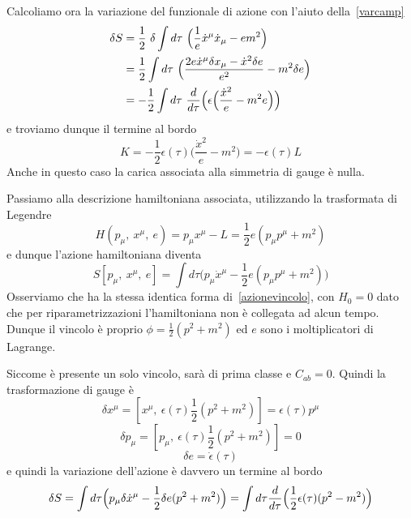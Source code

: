    Calcoliamo ora la variazione del funzionale di azione con l'aiuto della~\eqref{varcamp}
\begin{equation*}
\begin{aligned}
    \delta S & = \frac{1}{2} ~ \delta \int d\tau ~ \Big( \frac{1}{e} \dot x^\mu \dot x_\mu - e m^2 \Big) \\ & = \frac{1}{2} \int d\tau ~ \Big ( \frac{2 e \dot x^\mu \delta x_\mu - \dot x^2 \delta e}{e^2} - m^2 \delta e \Big) \\ & = -\frac{1}{2} \int d\tau ~ \frac{d}{d\tau} \Big(\epsilon \Big (\frac{\dot x^2}{e} - m^2 e \Big )\Big)
\end{aligned}
\end{equation*}
    e troviamo dunque il termine al bordo  
\begin{equation*}
    K = - \frac{1}{2} \epsilon(\tau) \Big (\frac{\dot x^2}{e} - m^2\Big ) = - \epsilon(\tau) L
\end{equation*}
    Anche in questo caso la carica associata alla simmetria di gauge è nulla.

    \hfill

    Passiamo alla descrizione hamiltoniana associata, utilizzando la trasformata di Legendre 
\begin{equation*}
    H(p_\mu, ~x^\mu, ~e) = p_\mu x^\mu - L = \frac{1}{2} e (p_\mu p^\mu + m^2)
\end{equation*}
    e dunque l'azione hamiltoniana diventa 
\begin{equation*}
    S[p_\mu, ~x^\mu, ~e] = \int d\tau \Big(p_\mu \dot x^\mu - \frac{1}{2} e (p_\mu p^\mu + m^2) \Big)
\end{equation*}
    Osserviamo che ha la stessa identica forma di~\eqref{azionevincolo}, con $H_0 = 0$ dato che per riparametrizzazioni l'hamiltoniana non è collegata ad alcun tempo. Dunque il vincolo è proprio $\phi = \frac{1}{2} (p^2 + m^2)$ ed $e$ sono i moltiplicatori di Lagrange. 

    Siccome è presente un solo vincolo, sarà di prima classe e $C_{ab} = 0$. Quindi la trasformazione di gauge è
\begin{equation}
    \delta x^\mu = [x^\mu, ~\epsilon(\tau) \frac{1}{2} (p^2 + m^2)] = \epsilon(\tau) p^\mu
\end{equation}
\begin{equation}
    \delta p_\mu = [p_\mu, ~\epsilon(\tau) \frac{1}{2} (p^2 + m^2)] = 0
\end{equation}
\begin{equation}
    \delta e = \dot \epsilon(\tau)
\end{equation}
    e quindi la variazione dell'azione è davvero un termine al bordo
\begin{equation*}
    \delta S = \int d\tau \Big( p_\mu \delta \dot x^\mu - \frac{1}{2} \delta e (p^2 + m^2)\Big) = \int d\tau \frac{d}{d\tau} \Big (\frac{1}{2} \epsilon(\tau) (p^2 - m^2) \Big)
\end{equation*}

